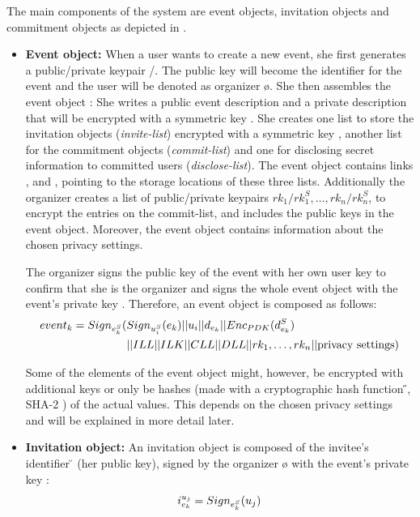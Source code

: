 The main components of the system are event objects, invitation objects
and commitment objects as depicted in .

\begin{itemize}
\item \textbf{Event object:} 
When a user wants to create a new event, she first generates a
public/private keypair \e{}/\eS{}. The public key will become the 
identifier for the event and the user will be denoted as organizer \o{}. 
She then assembles the event object \eo{}: She writes a public
event description \dP{} and a private description \dS{} that
will be encrypted with a symmetric key \PDK{}. 
%
She creates one list to store the invitation objects (\emph{invite-list})
encrypted with a symmetric key \ILK{}, another list for the
commitment objects (\emph{commit-list}) and one for disclosing secret
information to committed users (\emph{disclose-list}). The event object
contains links \ILL{}, \CLL{} and \DLL{}, pointing to the storage
locations of these three lists.
%
Additionally the organizer creates a list of public/private keypairs
$rk_1/rk_1^S, \dots, rk_n/rk_n^S$, to encrypt the entries on the
commit-list, and includes the public keys in the event object.
%
Moreover, the event object contains information about the chosen privacy
settings. 

The organizer signs the public key of the event with her own user key to
confirm that she is the organizer and signs the whole event object
\eo{} with the event's private key \eS{}. Therefore, an event object is composed
as follows:
\begin{align*}
	\eo = Sign_{\eS{}}(& Sign_{u_i^S}(\e{})||u_i|| \dP || Enc_{\PDK}(\dS{}) \\
		&|| \ILL{} || \ILK{} || \CLL{} || \DLL{} || rk_1, \dots, rk_n || \text{privacy settings})
\end{align*}

Some of the elements of the event object might, however, be encrypted
with additional keys or only be hashes (made with a cryptographic hash
function \H{}, \eg SHA-2 \cite{GilbertH03}) of the actual values. This
depends on the chosen privacy settings and will be explained in more
detail later.
\\

\item \textbf{Invitation object:} 
An invitation object is composed of the invitee's identifier \u{} (her public 
key), signed by the organizer \o{} with the event's private key \eS{}:
\begin{equation*}
		\i{} = Sign_{\eS{}}(\u{})
\end{equation*}


\end{itemize}
